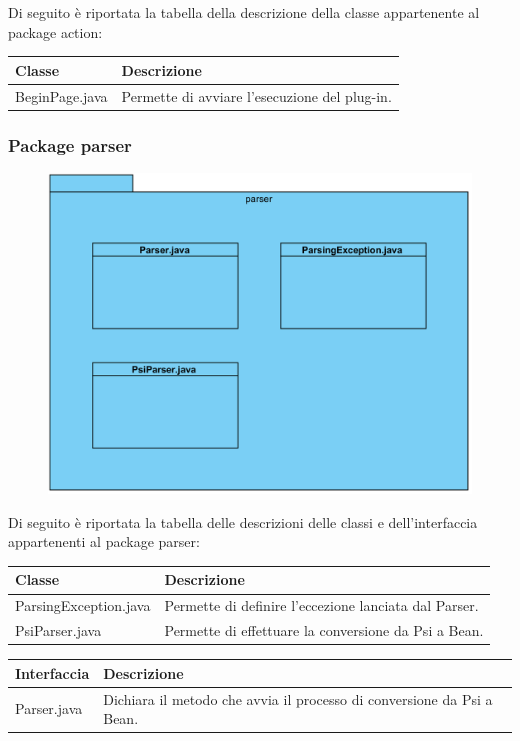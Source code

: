 \documentclass[11pt]{article}
\begin{document}
\begin{description}
\begin{figure}[!h]
\end{figure}
Di seguito è riportata la tabella della descrizione della classe appartenente al package action:
\item \begin{tabular}{|p{}|p{}|}
	\hline
	\textbf{Classe} & \textbf{Descrizione}\\
	\hline
	BeginPage.java & Permette di avviare l'esecuzione del plug-in. \\
	\hline
\end{tabular}
	\end{description}	
		\subsubsection{Package parser}
		\begin{figure}[!h]
			\centering
			\includegraphics{diagrams/ParserPackageDiagram}
		\end{figure}
		\begin{description}
			\item Di seguito è riportata la tabella delle descrizioni delle classi e dell'interfaccia appartenenti al package parser:
			\item \begin{tabular}{|p{}|p{}|}
				\hline
				\textbf{Classe} & \textbf{Descrizione}\\
				\hline
				ParsingException.java & Permette di definire l'eccezione lanciata dal Parser.  \\
				\hline
				PsiParser.java & Permette di effettuare la conversione da Psi a Bean.\\
				\hline
			\end{tabular}
			\item \begin{tabular}{|p{}|p{}|}
				\hline
				\textbf{Interfaccia} & \textbf{Descrizione}\\
				\hline				Parser.java & Dichiara il metodo che  avvia il processo di conversione da Psi a Bean. \\
				\hline
			\end{tabular}
		\end{description}
\end{document}
